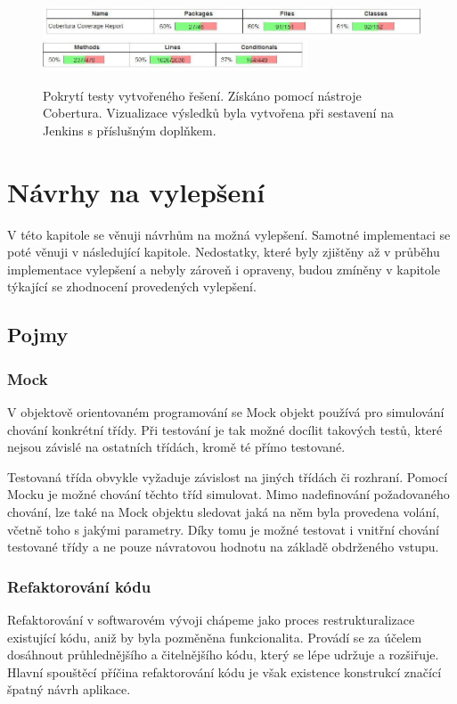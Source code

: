 \documentclass[thesis=B,czech]{FITthesis}[2012/06/26]
\begin{document}
\begin{figure}[h]\centering
 	\includegraphics[width=1.0\textwidth]{resources/cobertura-report-old-1}
 	\includegraphics[width=0.7\textwidth]{resources/cobertura-report-old-2}
	\caption[Pokrytí testy vytvořeného řešení]{Pokrytí testy vytvořeného řešení. Získáno pomocí nástroje Cobertura. Vizualizace
	výsledků byla vytvořena při sestavení na Jenkins s příslušným doplňkem.}\label{fig:dp-dia}
\end{figure}


\chapter{Návrhy na vylepšení}
V této kapitole se věnuji návrhům na možná vylepšení. Samotné implementaci se poté věnuji v následující kapitole. 
Nedostatky, které byly zjištěny až v průběhu implementace vylepšení a nebyly zároveň i opraveny, budou zmíněny v kapitole týkající se zhodnocení
provedených vylepšení.

\section{Pojmy}

\subsection{Mock}
V objektově orientovaném programování se Mock objekt používá pro simulování chování konkrétní třídy.\cite{mock}
Při testování je tak možné docílit takových testů, které nejsou závislé na ostatních třídách, kromě té přímo testované.
\par
Testovaná třída obvykle vyžaduje závislost na jiných třídách či rozhraní. Pomocí Mocku je možné chování těchto tříd simulovat.
Mimo nadefinování požadovaného chování, lze také na Mock objektu sledovat jaká na něm byla provedena volání, včetně toho
s jakými parametry. Díky tomu je možné testovat i vnitřní chování testované třídy a ne pouze návratovou hodnotu na základě 
obdrženého vstupu.\cite{mock}

\subsection{Refaktorování kódu}
Refaktorování v softwarovém vývoji chápeme jako proces restrukturalizace existující kódu, aniž by byla 
pozměněna funkcionalita. Provádí se za účelem dosáhnout průhlednějšího a čitelnějšího kódu, který
se lépe udržuje a rozšiřuje. \cite{refaktoring} Hlavní spouštěcí příčina refaktorování kódu je však existence 
konstrukcí značící špatný návrh aplikace. 
\end{document}
